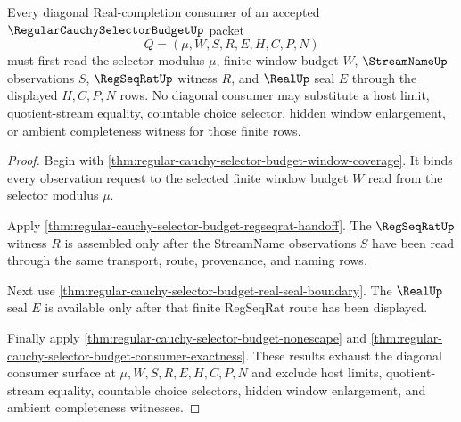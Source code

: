 \begin{theorem}
\label{thm:regular-cauchy-selector-budget-diagonal-use}
Every diagonal Real-completion consumer of an accepted $\RegularCauchySelectorBudgetUp$ packet
$$
Q=(\mu,W,S,R,E,H,C,P,N)
$$
must first read the selector modulus $\mu$, finite window budget $W$, $\StreamNameUp$ observations $S$, $\RegSeqRatUp$ witness $R$, and $\RealUp$ seal $E$ through the displayed $H,C,P,N$ rows. No diagonal consumer may substitute a host limit, quotient-stream equality, countable choice selector, hidden window enlargement, or ambient completeness witness for those finite rows.
\end{theorem}
\begin{proof}
Begin with \autoref{thm:regular-cauchy-selector-budget-window-coverage}. It binds every observation request to the selected finite window budget $W$ read from the selector modulus $\mu$.

Apply \autoref{thm:regular-cauchy-selector-budget-regseqrat-handoff}. The $\RegSeqRatUp$ witness $R$ is assembled only after the StreamName observations $S$ have been read through the same transport, route, provenance, and naming rows.

Next use \autoref{thm:regular-cauchy-selector-budget-real-seal-boundary}. The $\RealUp$ seal $E$ is available only after that finite RegSeqRat route has been displayed.

Finally apply \autoref{thm:regular-cauchy-selector-budget-nonescape} and \autoref{thm:regular-cauchy-selector-budget-consumer-exactness}. These results exhaust the diagonal consumer surface at $\mu,W,S,R,E,H,C,P,N$ and exclude host limits, quotient-stream equality, countable choice selectors, hidden window enlargement, and ambient completeness witnesses.
\end{proof}

